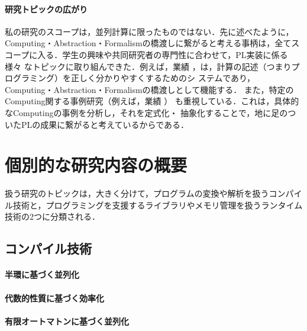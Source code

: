 \documentclass[dvipdfmx]{jsarticle}
\begin{document}
\paragraph{研究トピックの広がり}
私の研究のスコープは，並列計算に限ったものではない．先に述べたように，
Computing・Abstraction・Formalismの橋渡しに繋がると考える事柄は，全てス
コープに入る．学生の興味や共同研究者の専門性に合わせて，PL実装に係る様々
なトピックに取り組んできた．例えば，業績
\cite{gpce14:libdsl,aplas16:pyblame,ppl22:plags,pro22o:far_memory,jssst22:checkpoint,splash22:mvnb}
，は，計算の記述（つまりプログラミング）を正しく分かりやすくするためのシ
ステムであり，Computing・Abstraction・Formalismの橋渡しとして機能する．
また，特定のComputing関する事例研究（例えば，業績
\cite{icpp15:htm,ispass21:ib_odp,ppl22:sfa,ispass22:vipp,ppl23c3:otf_sfa}）
も重視している．これは，具体的なComputingの事例を分析し，それを定式化・
抽象化することで，地に足のついたPLの成果に繋がると考えているからである．


\section*{個別的な研究内容の概要}
扱う研究のトピックは，大きく分けて，プログラムの変換や解析を扱うコンパイ
ル技術と，プログラミングを支援するライブラリやメモリ管理を扱うランタイム
技術の2つに分類される．

\subsection*{コンパイル技術}

\paragraph{半環に基づく並列化}

 \cite{pldi21:red_par}

 \cite{pldi11:red_par}

 \cite{jssst13:sd_dfa,aplas14:sd_dfa}

 \cite{jip17:hadoop}

 \cite{pro13:tree_par}

\paragraph{代数的性質に基づく効率化}
\cite{splash19:nbody}
\cite{aplas09:gpu_skel}

\paragraph{有限オートマトンに基づく並列化}
\cite{ipdps21:plex,ppl22:sfa,ppl23c3:otf_sfa}
 \cite{ppl23:zdd}
\end{document}
